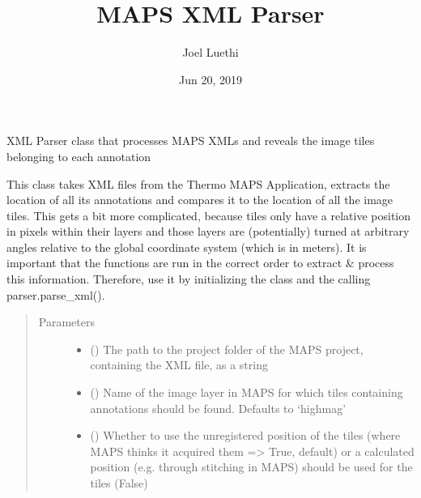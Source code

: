 \documentclass[letterpaper,10pt,english]{sphinxmanual}
\title{MAPS XML Parser}
\date{Jun 20, 2019}
\author{Joel Luethi}
\begin{document}
\pagestyle{empty}
\sphinxmaketitle
\pagestyle{plain}
\sphinxtableofcontents
\pagestyle{normal}
\label{\detokenize{index::doc}}


\begin{fulllineitems}
\label{\detokenize{index:sites_of_interest_parser.MapsXmlParser}}
XML Parser class that processes MAPS XMLs and reveals the image tiles belonging to each annotation

This class takes XML files from the Thermo MAPS Application, extracts the location of all its annotations and
compares it to the location of all the image tiles. This gets a bit more complicated, because tiles only have a
relative position in pixels within their layers and those layers are (potentially) turned at arbitrary angles
relative to the global coordinate system (which is in meters).
It is important that the functions are run in the correct order to extract \& process this information. Therefore,
use it by initializing the class and the calling parser.parse\_xml().
\begin{quote}\begin{description}
\item[{Parameters}] \leavevmode\begin{itemize}
\item {} 
 () \textendash{} The path to the project folder of the MAPS project, containing the XML file, as a string

\item {} 
 () \textendash{} Name of the image layer in MAPS for which tiles containing annotations should
be found. Defaults to ‘highmag’

\item {} 
 () \textendash{} Whether to use the unregistered position of the tiles (where MAPS thinks it
acquired them =\textgreater{} True, default) or a calculated position (e.g. through stitching in MAPS) should be used for
the tiles (False)


\end{itemize}
\end{description}
\end{quote}
\end{fulllineitems}
\end{document}
